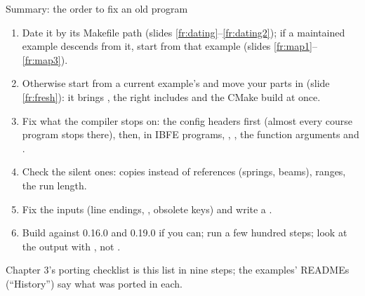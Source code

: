 \documentclass[aspectratio=169,11pt]{beamer}
\begin{document}
\begin{frame}{Summary: the order to fix an old program}
\label{fr:summary}
\small
\begin{enumerate}\setlength{\itemsep}{2pt}
  \item Date it by its Makefile path (slides \ref{fr:dating}--\ref{fr:dating2}); if a maintained example descends from it, start from that example (slides \ref{fr:map1}--\ref{fr:map3}).
  \item Otherwise start from a current example's  and move your parts in (slide \ref{fr:fresh}): it brings , the right includes and the CMake build at once.
  \item Fix what the compiler stops on: the config headers first (almost every course program stops there), then, in IBFE programs, , , the function arguments and .
  \item Check the silent ones: copies instead of references (springs, beams), \code{[first, second)} ranges, the run length.
  \item Fix the inputs (line endings, , obsolete keys) and write a .
  \item Build against 0.16.0 and 0.19.0 if you can; run a few hundred steps; look at the output with , not .
\end{enumerate}
\begin{punchbox}
\small Chapter 3's porting checklist is this list in nine steps; the examples' READMEs (``History'') say what was ported in each.
\end{punchbox}
\end{frame}
\end{document}
